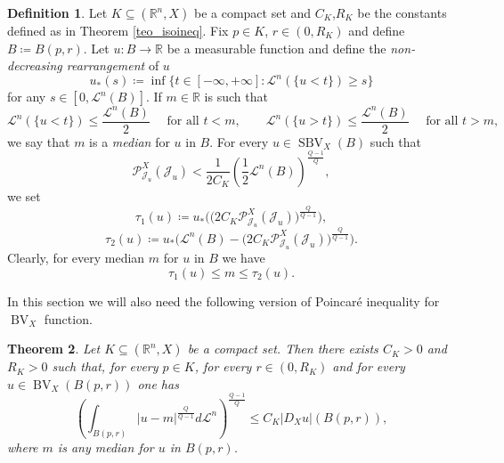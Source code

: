 \documentclass[12pt,a4paper]{amsart}
\theoremstyle{definition}
\newtheorem{defi}{Definition}[section]
\theoremstyle{plain}
\newtheorem{teo}[defi]{Theorem}
\newcommand{\R}{\mathbb{R}}
\newcommand{\se}{\subseteq}
\newcommand{\ceq}{\coloneqq}
\newcommand{\pxu}{{\mathcal{P}^X_{\mathcal{J}_u}}}
\newcommand{\leb}{\mathcal{L}}
\newcommand{\sbv}{\operatorname{SBV}}
\newcommand{\bv}{\operatorname{BV}}
\newcommand{\J}{\mathcal{J}}
\begin{document}
\begin{defi} 
Let $K \se (\R^n,X)$ be a compact set and $C_K$,$R_K$ be the constants defined as in Theorem \ref{teo_isoineq}. Fix $p \in K$, $r \in (0,R_K)$ 
and define $B \ceq B(p,r)$. Let $u:B \to \R$ be a measurable function and define the \emph{non-decreasing rearrangement} of $u$
\[
u_*(s) \ceq \inf \{ t \in [-\infty,+\infty]: \leb^n(\{u<t\}) \geq s \}
\]
for any $s \in [0,\leb^n(B)]$. If $m \in \R$ is such that
\[
\leb^n( \{u<t\}) \leq \frac{\leb^n(B)}{2} \quad \text{ for all }t<m, \qquad \leb^n( \{u>t\}) \leq \frac{\leb^n(B)}{2} \quad \text{ for all }t>m,
\]
 we say that $m$ is a \emph{median} for $u$ in $B$. For every $u \in \sbv_X(B)$ such that 
    \begin{equation}\label{eq_condhj}
        \pxu(\J_u)<\frac{1}{2C_K}\left(\frac{1}{2}\leb^n(B)  \right)^{\frac{Q-1}{Q}},
    \end{equation} 
we set
\begin{equation}\label{eq_tau1}
    \tau_1(u) \ceq u_* \bigg( \big(2  C_K \pxu(\J_u)\big)^\frac{Q}{Q-1} \bigg),
\end{equation}
    \begin{equation}\label{eq_tau2}
    \tau_2(u) \ceq u_* \bigg( \leb^n(B)- \big(2C_K \pxu(\J_u)\big)^\frac{Q}{Q-1} \bigg).
\end{equation}
Clearly, for every median $m$ for $u$ in $B$ we have
\[
\tau_1(u) \leq m \leq \tau_2(u).
\]
\end{defi}

In this section we will also need the following version of Poincaré inequality for $\bv_X$ function. 
\begin{teo}\label{teo_poincarebv}
    Let $K \se (\R^n,X)$ be a compact set. Then there exists $C_K>0$ and $R_K>0$ such that, for every $p \in K$, for  every $r \in (0,R_K)$ and for every $u \in \bv_{X}(B(p,r))$ one has
    \[
  \left(  \int_{B(p,r)} |u-m|^\frac{Q}{Q-1}d\leb^n \right)^\frac{Q-1}{Q}\leq C_K|D_Xu|(B(p,r)),
    \]
    where $m$ is any median for $u$ in $B(p,r)$.
\end{teo}
\end{document}
